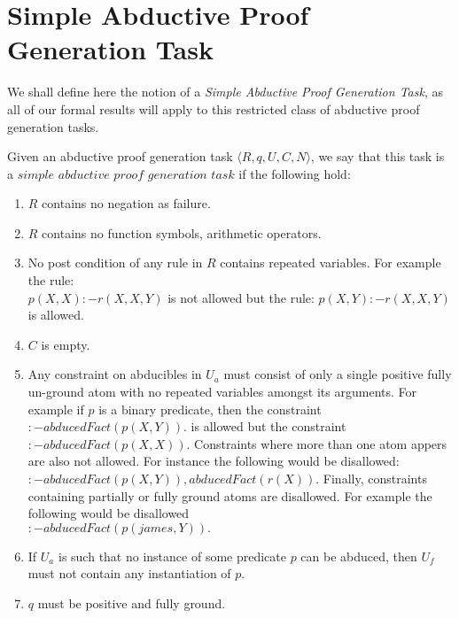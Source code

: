 \section{Simple Abductive Proof Generation Task}

We shall define here the notion of a
\textit{Simple Abductive Proof Generation Task}, as all of our formal results
will apply to this restricted class of abductive proof generation tasks.

\begin{definition}\label{simpletask}
Given an abductive proof generation task $\langle R,q,U,C,N \rangle$, we say that this task is a $\textit{simple abductive proof generation task}$ if the following hold:
\begin{enumerate}
\item $R$ contains no negation as failure.
\item $R$ contains no function symbols, arithmetic operators.
\item No post condition of any rule in $R$ contains repeated variables. For example the rule:\\
$p(X,X):-r(X,X,Y)$ is not allowed but the rule: $p(X,Y):-r(X,X,Y)$ is allowed.
\item $C$ is empty.
\item Any constraint on abducibles in $U_{a}$ must consist of only a single
  positive fully un-ground atom with no repeated variables amongst its
  arguments. For example if $p$ is a binary predicate, then the constraint
  $:-abducedFact(p(X,Y)).$ is allowed but the constraint
  $:-abducedFact(p(X,X)).$ Constraints where more than one atom appers are
  also not allowed. For instance the following would be disallowed:
  $:-abducedFact(p(X,Y)),abducedFact(r(X)).$ Finally, constraints containing
  partially or fully ground atoms are disallowed. For example the following
  would be disallowed\\ $:-abducedFact(p(james,Y)).$
\item If $U_{a}$ is such that no instance of some predicate $p$ can be
  abduced, then $U_{f}$ must not contain any instantiation of $p$.
\item $q$ must be positive and fully ground.
\end{enumerate}
\end{definition}




